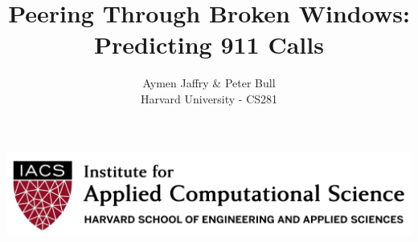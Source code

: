 \documentclass[a0,final]{a0poster}
\title{Peering Through Broken Windows: \\Predicting 911 Calls}
\author{Aymen Jaffry \& Peter Bull\\
Harvard University - CS281}
\begin{document}
\hspace{-3cm}								%
\colorbox{boxcol}{						%
\begin{minipage}{600mm}
\maketitle
\end{minipage}
\begin{minipage}{575mm}					%
\includegraphics[width=1\textwidth,right]{iacs_logo.png}
\end{minipage}}

\vspace{1cm}
\end{document}
